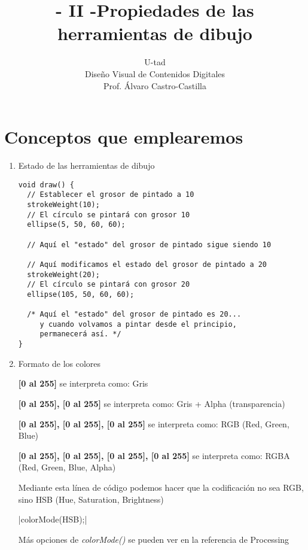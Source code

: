 \documentclass[a4paper,oneside]{article}
\title{- II -\linebreak Propiedades de las herramientas de dibujo}
\author{U-tad\\ Diseño Visual de Contenidos Digitales\\ Prof. Álvaro Castro-Castilla}
\date{}
\begin{document}
\maketitle


\section{Conceptos que emplearemos}
\begin{enumerate}
  \item Estado de las herramientas de dibujo

    \begin{verbatim}
void draw() {
  // Establecer el grosor de pintado a 10
  strokeWeight(10);
  // El círculo se pintará con grosor 10
  ellipse(5, 50, 60, 60);

  // Aquí el "estado" del grosor de pintado sigue siendo 10

  // Aquí modificamos el estado del grosor de pintado a 20
  strokeWeight(20);
  // El círculo se pintará con grosor 20
  ellipse(105, 50, 60, 60);

  /* Aquí el "estado" del grosor de pintado es 20...
     y cuando volvamos a pintar desde el principio,
     permanecerá así. */
}
    \end{verbatim}

  \item Formato de los colores

    \textbf{[0 al 255]} se interpreta como: Gris

    \textbf{[0 al 255], [0 al 255]} se interpreta como: Gris + Alpha (transparencia)
    
    \textbf{[0 al 255], [0 al 255], [0 al 255]} se interpreta como: RGB (Red, Green, Blue)

    \textbf{[0 al 255], [0 al 255], [0 al 255], [0 al 255]} se interpreta como: RGBA (Red, Green, Blue, Alpha)

    Mediante esta línea de código podemos hacer que la codificación no sea RGB, sino HSB (Hue, Saturation, Brightness)

     |colorMode(HSB);|

    Más opciones de \textit{colorMode()} se pueden ver en la referencia de Processing
\end{enumerate}
\end{document}
